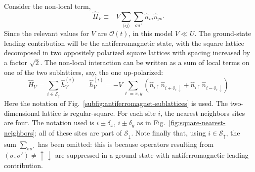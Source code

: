 Consider the non-local term,
\begin{equation}\label{eq:extended-hubbard-nonlocal-interaction}
	\hat H_V \equiv - V \sum_{\langle ij \rangle} \sum_{\sigma \sigma'} \hat n_{i\sigma} \hat n_{j\sigma'}
\end{equation}
{\color{tabred}Since the relevant values for $V$ are $\mathcal{O}(t)$, in this model $V \ll U$.} The ground-state leading contribution will be the antiferromagnetic state, with the square lattice decomposed in two oppositely polarized square lattices with spacing increased by a factor $\sqrt{2}$. The non-local interaction can be written as a sum of local terms on one of the two sublattices, say, the one up-polarized:
\[
	\hat H_V = \sum_{i \in \mathcal{S}_\uparrow} \hat h_V^{(i)}
	\qquad
	\hat h_V^{(i)} = -V \sum_{\ell = x,y} \left(
		\hat n_{i\uparrow} \hat n_{i + \delta_\ell \downarrow} + \hat n_{i\uparrow} \hat n_{i - \delta_\ell \downarrow} 
	\right) 
\]
Here the notation of Fig.~\ref{subfig:antiferromagnet-sublattices} is used. The two-dimensional lattice is regular-square. For each site $i$, the nearest neighbors sites are four. The notation used is $i \pm \delta_x$, $i \pm  \delta_y$ as in Fig.~\ref{fig:square-nearest-neighbors}; all of these sites are part of $\mathcal{S}_\downarrow$. Note finally that, using $i \in \mathcal{S}_\uparrow$, the sum $\sum_{\sigma \sigma'}$ has been omitted: this is because operators resulting from $(\sigma, \sigma') \neq \uparrow\downarrow$ are suppressed in a ground-state with antiferromagnetic leading contribution.

